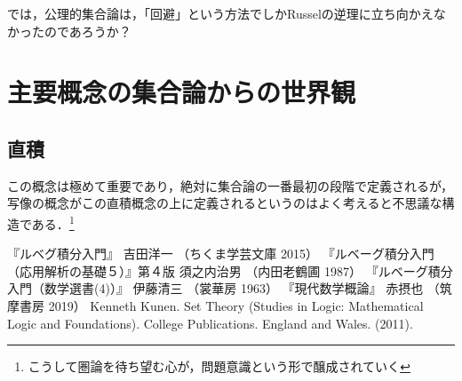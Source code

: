 \documentclass[uplatex, 12pt, a4paper, dvipdfmx]{jsarticle}
\begin{document}
では，公理的集合論は，「回避」という方法でしかRusselの逆理に立ち向かえなかったのであろうか？

\section{主要概念の集合論からの世界観}

\subsection{直積}
この概念は極めて重要であり，絶対に集合論の一番最初の段階で定義されるが，写像の概念がこの直積概念の上に定義されるというのはよく考えると不思議な構造である．\footnote{こうして圏論を待ち望む心が，問題意識という形で醸成されていく}


\begin{thebibliography}{99}
	 『ルベグ積分入門』 吉田洋一 （ちくま学芸文庫 2015）
	 『ルベーグ積分入門（応用解析の基礎５）』第４版 須之内治男 （内田老鶴圃 1987）
	 『ルベーグ積分入門（数学選書(4)）』 伊藤清三 （裳華房 1963）
	 『現代数学概論』 赤摂也 （筑摩書房 2019）
	 Kenneth Kunen. Set Theory (Studies in Logic: Mathematical Logic and Foundations). College Publications. England and Wales. (2011).
\end{thebibliography}
\end{document}
